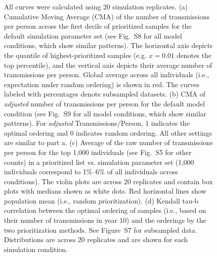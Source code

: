 \documentclass[a4paper,11pt]{article}
\newcommand{\PLWH}{sample\xspace}
\begin{document}
\begin{figure}[!tp]
{All curves were calculated using 20 simulation replicates.
(a) Cumulative Moving Average (CMA) of the number of transmissions per person across the first decile of prioritized \PLWH{s} for the default simulation parameter set (see Fig.~S8 for all model conditions, which show similar patterns).
The horizontal axis depicts the quantile of highest-prioritized \PLWH{s} (e.g. $x=0.01$ denotes the top percentile), and the vertical axis depicts their average number of transmissions per person.
Global average across all individuals (i.e., expectation under random ordering) is shown in red.
The curves labeled with percentages denote subsampled datasets.
(b) CMA of \textit{adjusted} number of transmissions per person for the default model condition (see Fig.~S9 for all model conditions, which show similar patterns). 
For \textit{adjusted} Transmissions/Person, 1 indicates the optimal ordering and 0 indicates  random ordering.
All other settings are similar to part a. 
(c) Average of the raw number of transmissions per person for the top 1,000 individuals (see Fig.~S5 for other counts) in a prioritized list vs. simulation parameter set (1,000 individuals correspond to 1\%--6\% of all individuals across conditions). The violin plots are across 20 replicates and contain box plots with medians shown as white dots.
Red horizontal lines show population mean (i.e., random prioritization).
(d) Kendall tau-b correlation between the optimal ordering of \PLWH{s} (i.e., based on their number of transmissions in year 10) and the orderings by the two prioritization methods.
See Figure~S7 for subsampled data. 
Distributions are across 20 replicates and are shown for each simulation condition. 
}\label{fig:efficacy-main}
\end{figure}











\end{document}
